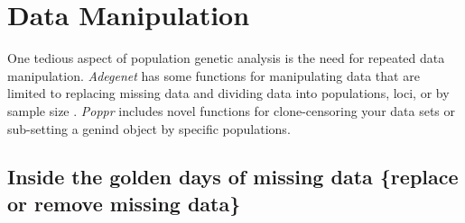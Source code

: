 \documentclass[letterpaper]{article}\usepackage[]{graphicx}\usepackage[]{color}
\newcommand{\tab}{\hspace*{1em}}
\begin{document}
% 
%
%
%
\section{Data Manipulation}\label{data.manip}

\tab\tab One tedious aspect of population genetic analysis is the need for repeated data manipulation. \textit{Adegenet} has some functions for manipulating data that are limited to replacing missing data and dividing data into populations, loci, or by sample size \cite{Jombart:2008}. \textit{Poppr} includes novel functions for clone-censoring your data sets or sub-setting a genind object by specific populations.
\subsection{Inside the golden days of missing data \{replace or remove missing data\}}\label{data.manip:missing}
\end{document}
